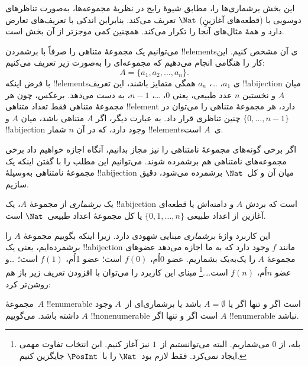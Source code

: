 \documentclass[../../../include/open-logic-section]{subfiles}
\begin{document}


\begin{editorial}
  این بخش برشماری‌ها را، مطابق شیوهٔ رایج در نظریهٔ مجموعه‌ها، به‌صورت
  تناظرهای دوسویی با (قطعه‌های آغازینِ) $\Nat$ تعریف می‌کند. بنابراین
  اندکی با تعریف‌های  تعارض دارد و همهٔ مثال‌های آنجا
  را تکرار می‌کند. همچنین کمی موجزتر از آن بخش است.
\end{editorial}

می‌توانیم یک مجموعهٔ متناهی را صرفاً با برشمردن
!!{element}sی آن مشخص کنیم. این کار را هنگامی انجام می‌دهیم که مجموعه‌ای را
به‌صورت زیر تعریف می‌کنیم:
\[
  A = \{a_1, a_2, \ldots, a_n\}.
\]
با فرض اینکه !!{element}sی $a_1$، \dots، $a_n$ همگی متمایز باشند،
این تعریف !!a{bijection} میان $A$ و نخستین $n$ عدد طبیعی، یعنی $0$،
\dots، $n-1$، به دست می‌دهد. برعکس، چون هر مجموعهٔ متناهی فقط تعداد
متناهی !!{element} دارد، هر مجموعهٔ متناهی را می‌توان در چنین تناظری
قرار داد. به عبارت دیگر، اگر $A$ متناهی باشد، میان $A$ و
$\{0, \dots, n-1\}$ !!a{bijection} وجود دارد، که در آن $n$ شمار
!!{element}sی~$A$ است.

اگر برخی گونه‌های مجموعهٔ نامتناهی را نیز مجاز بدانیم، آنگاه اجازه
خواهیم داد برخی مجموعه‌های نامتناهی هم برشمرده شوند. می‌توانیم این مطلب
را با گفتن اینکه یک مجموعهٔ نامتناهی به‌وسیلهٔ !!a{bijection} میان آن
و کل~$\Nat$ برشمرده می‌شود، دقیق سازیم.

\begin{defn}
یک \emph{برشماری} از مجموعهٔ $A$، یک !!a{bijection} است که بردش $A$
و دامنه‌اش یا قطعه‌ای آغازین از اعداد طبیعی $\{0,
1, \ldots, n\}$ {یا} کل مجموعهٔ اعداد طبیعی~$\Nat$ است.
\end{defn}

\begin{explain}
این کاربرد واژهٔ \emph{برشماری} مبنایی شهودی دارد. زیرا اینکه بگوییم
مجموعهٔ $A$ را برشمرده‌ایم، یعنی یک !!a{bijection} مانند $f$ وجود دارد
که به ما اجازه می‌دهد عضوهای مجموعهٔ $A$ را یک‌به‌یک بشماریم. عضو
$0$اُم، $f(0)$ است؛ عضو 1اُم، $f(1)$ است؛ \ldots و عضو $n$اُم،
$f(n)$ است\ldots.\footnote{بله، از $0$ می‌شماریم. البته می‌توانستیم
از~$1$ نیز آغاز کنیم. این انتخاب تفاوت مهمی ایجاد نمی‌کرد. فقط لازم
بود~$\Nat$ را با~$\PosInt$ جایگزین کنیم.} مبنای این کاربرد را می‌توان
با افزودن تعریف زیر باز هم روشن‌تر کرد:
\end{explain}

\begin{defn}
  مجموعهٔ~$A$ !!{enumerable} است اگر و تنها اگر یا $A = \emptyset$
  باشد یا برشماری‌ای از~$A$ وجود داشته باشد. می‌گوییم $A$
  !!{nonenumerable} است اگر و تنها اگر $A$ !!{enumerable} نباشد.
\end{defn}
\end{document}
